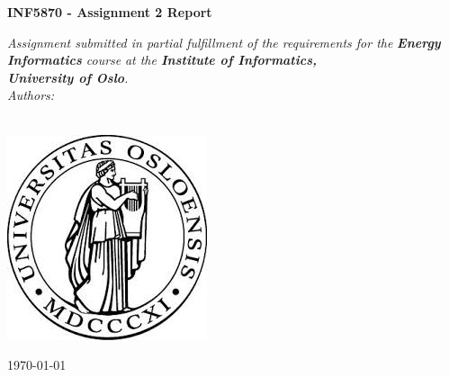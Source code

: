 
\begin{titlepage}
\begin{center}

\vspace*{.06\textheight}

{\huge \bfseries INF5870 - Assignment 2 Report \par}\vspace{1cm} %

\Large \textit{Assignment submitted in partial fulfillment of the requirements for the}
\textit{\textbf{Energy Informatics} course}  %
\textit{at the \textbf{Institute of Informatics,}}\\
\textit{\textbf{University of Oslo}.}\\[1cm]

\Large \textit{Authors:}\\
\LARGE \authorname\\

\vfill

\includegraphics[scale=0.5]{figures/uioLogo.jpg}\\[1cm]

\vfill

{\large \today}\\[4cm] %

\vfill
\end{center}
\end{titlepage}
